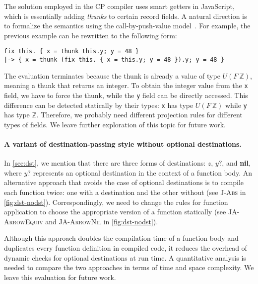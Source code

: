 The solution employed in the CP compiler uses smart getters in JavaScript, which
is essentially adding \emph{thunks} to certain record fields. A natural
direction is to formalize the semantics using the call-by-push-value
model~\citep{levy2012call}. For example, the previous example can be rewritten
to the following form:
\begin{lstlisting}[morekeywords=thunk]
    fix this. { x = thunk this.y; y = 48 }
|-> { x = thunk (fix this. { x = this.y; y = 48 }).y; y = 48 }
\end{lstlisting}
The evaluation terminates because the thunk is already a value of type $U (F\
\mathbb{Z})$, meaning a thunk that returns an integer. To obtain the integer
value from the \lstinline{x} field, we have to force the thunk, while the
\lstinline{y} field can be directly accessed. This difference can be detected
statically by their types: \lstinline{x} has type $U (F\ \mathbb{Z})$ while
\lstinline{y} has type $\mathbb{Z}$. Therefore, we probably need different
projection rules for different types of fields. We leave further exploration of
this topic for future work.

\paragraph{A variant of destination-passing style without optional destinations.}
In \autoref{sec:dst}, we mention that there are three forms of destinations:
$z$, $y?$, and \textbf{nil}, where $y?$ represents an optional destination in
the context of a function body. An alternative approach that avoids the case of
optional destinations is to compile each function twice: one with a destination
and the other without (see \textsc{J-Abs} in \autoref{fig:dst-nodst}).
Correspondingly, we need to change the rules for function application to choose
the appropriate version of a function statically (see \textsc{JA-ArrowEquiv} and
\textsc{JA-ArrowNil} in \autoref{fig:dst-nodst}).

Although this approach doubles the compilation time of a function body and
duplicates every function definition in compiled code, it reduces the overhead
of dynamic checks for optional destinations at run time. A quantitative analysis
is needed to compare the two approaches in terms of time and space complexity.
We leave this evaluation for future work.

